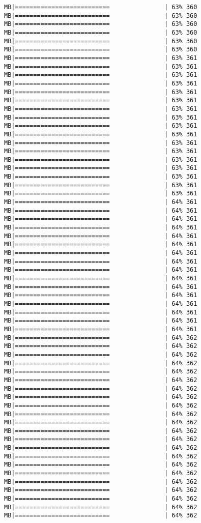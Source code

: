 \documentclass[
]{article}
\begin{document}
\begin{verbatim}
MB|==========================               | 63% 360 MB|==========================               | 63% 360 MB|==========================               | 63% 360 MB|==========================               | 63% 360 MB|==========================               | 63% 360 MB|==========================               | 63% 360 MB|==========================               | 63% 361 MB|==========================               | 63% 361 MB|==========================               | 63% 361 MB|==========================               | 63% 361 MB|==========================               | 63% 361 MB|==========================               | 63% 361 MB|==========================               | 63% 361 MB|==========================               | 63% 361 MB|==========================               | 63% 361 MB|==========================               | 63% 361 MB|==========================               | 63% 361 MB|==========================               | 63% 361 MB|==========================               | 63% 361 MB|==========================               | 63% 361 MB|==========================               | 63% 361 MB|==========================               | 63% 361 MB|==========================               | 63% 361 MB|==========================               | 64% 361 MB|==========================               | 64% 361 MB|==========================               | 64% 361 MB|==========================               | 64% 361 MB|==========================               | 64% 361 MB|==========================               | 64% 361 MB|==========================               | 64% 361 MB|==========================               | 64% 361 MB|==========================               | 64% 361 MB|==========================               | 64% 361 MB|==========================               | 64% 361 MB|==========================               | 64% 361 MB|==========================               | 64% 361 MB|==========================               | 64% 361 MB|==========================               | 64% 361 MB|==========================               | 64% 361 MB|==========================               | 64% 362 MB|==========================               | 64% 362 MB|==========================               | 64% 362 MB|==========================               | 64% 362 MB|==========================               | 64% 362 MB|==========================               | 64% 362 MB|==========================               | 64% 362 MB|==========================               | 64% 362 MB|==========================               | 64% 362 MB|==========================               | 64% 362 MB|==========================               | 64% 362 MB|==========================               | 64% 362 MB|==========================               | 64% 362 MB|==========================               | 64% 362 MB|==========================               | 64% 362 MB|==========================               | 64% 362 MB|==========================               | 64% 362 MB|==========================               | 64% 362 MB|==========================               | 64% 362 MB|==========================               | 64% 362 MB|==========================               | 64% 362 MB|==========================               | 64% 362 
\end{verbatim}
\end{document}
